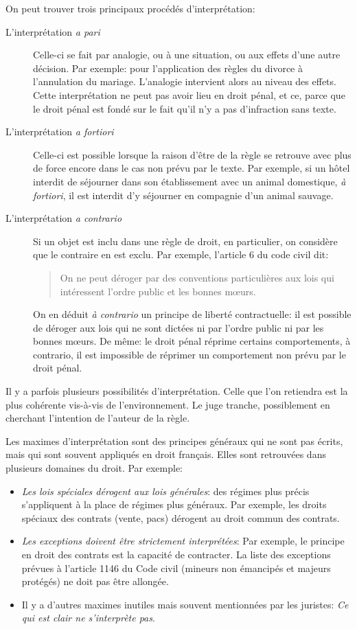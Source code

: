 \documentclass[math]{cours}
\begin{document}
On peut trouver trois principaux procédés d'interprétation:
\begin{description}
	\item[L'interprétation \textit{a pari}]
	      Celle-ci se fait par analogie, ou à une situation, ou aux effets d'une autre décision.
	      Par exemple: pour l'application des règles du divorce à l'annulation du mariage.
	      L'analogie intervient alors au niveau des effets.
	      Cette interprétation ne peut pas avoir lieu en droit pénal, et ce, parce que le droit pénal est fondé sur le fait qu'il n'y a pas d'infraction sans texte.

	\item[L'interprétation \textit{a fortiori}]
	      Celle-ci est possible lorsque la raison d'être de la règle se retrouve avec plus de force encore dans le cas non prévu par le texte.
	      Par exemple, si un hôtel interdit de séjourner dans son établissement avec un animal domestique, \textit{à fortiori}, il est interdit d'y séjourner en compagnie d'un animal sauvage.

	\item[L'interprétation \textit{a contrario}]
	      Si un objet est inclu dans une règle de droit, en particulier, on considère que le contraire en est exclu.
	      Par exemple, l'article 6 du code civil dit:
	      \begin{quote}
		      On ne peut déroger par des conventions particulières aux lois qui intéressent l'ordre public et les bonnes m\oe urs.
	      \end{quote}
	      On en déduit \textit{à contrario} un principe de liberté contractuelle: il est possible de déroger aux lois qui ne sont dictées ni par l'ordre public ni par les bonnes m\oe urs.
	      De même: le droit pénal réprime certains comportements, à contrario, il est impossible de réprimer un comportement non prévu par le droit pénal.
\end{description}
Il y a parfois plusieurs possibilités d'interprétation.
Celle que l'on retiendra est la plus cohérente vis-à-vis de l'environnement.
Le juge tranche, possiblement en cherchant l'intention de l'auteur de la règle.

Les maximes d'interprétation sont des principes généraux qui ne sont pas écrits, mais qui sont souvent appliqués en droit français.
Elles sont retrouvées dans plusieurs domaines du droit.
Par exemple:
\begin{itemize}
	\item \textit{Les lois spéciales dérogent aux lois générales}: des régimes plus précis s'appliquent à la place de régimes plus généraux.
	      Par exemple, les droits spéciaux des contrats (vente, pacs) dérogent au droit commun des contrats.
	\item \textit{Les exceptions doivent être strictement interprétées}:
	      Par exemple, le principe en droit des contrats est la capacité de contracter.
	      La liste des exceptions prévues à l'article 1146 du Code civil (mineurs non émancipés et majeurs protégés) ne doit pas être allongée.
	\item Il y a d'autres maximes inutiles mais souvent mentionnées par les juristes: \textit{Ce qui est clair ne s'interprète pas}.
\end{itemize}
\end{document}
